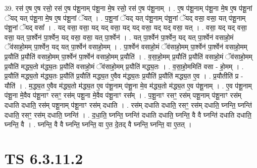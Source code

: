 \documentclass[17pt]{extarticle}
\begin{document}
39. रस॑ ए॒ष ए॒ष रसो॒ रस॑ ए॒ष प॑शू॒नाम् प॑शू॒ना मे॒ष रसो॒ रस॑ ए॒ष प॑शू॒नाम् । . ए॒ष प॑शू॒नाम् प॑शू॒ना मे॒ष ए॒ष प॑शू॒नां ॅयद् यत् प॑शू॒ना मे॒ष ए॒ष प॑शू॒नां ॅयत् । . प॒शू॒नां ॅयद् यत् प॑शू॒नाम् प॑शू॒नां ॅयद् वसा॒ वसा॒ यत् प॑शू॒नाम् प॑शू॒नां ॅयद् वसा᳚ । . यद् वसा॒ वसा॒ यद् यद् वसा॒ यद् यद् वसा॒ यद् यद् वसा॒ यत् । . वसा॒ यद् यद् वसा॒ वसा॒ यत् पा॒र्श्वेन॑ पा॒र्श्वेन॒ यद् वसा॒ वसा॒ यत् पा॒र्श्वेन॑ । . यत् पा॒र्श्वेन॑ पा॒र्श्वेन॒ यद् यत् पा॒र्श्वेन॑ वसाहो॒मं ॅव॑साहो॒मम् पा॒र्श्वेन॒ यद् यत् पा॒र्श्वेन॑ वसाहो॒मम् । . पा॒र्श्वेन॑ वसाहो॒मं ॅव॑साहो॒मम् पा॒र्श्वेन॑ पा॒र्श्वेन॑ वसाहो॒मम् प्र॒यौति॑ प्र॒यौति॑ वसाहो॒मम् पा॒र्श्वेन॑ पा॒र्श्वेन॑ वसाहो॒मम् प्र॒यौति॑ । . व॒सा॒हो॒मम् प्र॒यौति॑ प्र॒यौति॑ वसाहो॒मं ॅव॑साहो॒मम् प्र॒यौति॑ मद्ध्य॒तो म॑द्ध्य॒तः प्र॒यौति॑ वसाहो॒मं ॅव॑साहो॒मम् प्र॒यौति॑ मद्ध्य॒तः । . व॒सा॒हो॒ममिति॑ वसा - हो॒मम् । . प्र॒यौति॑ मद्ध्य॒तो म॑द्ध्य॒तः प्र॒यौति॑ प्र॒यौति॑ मद्ध्य॒त ए॒वैव म॑द्ध्य॒तः प्र॒यौति॑ प्र॒यौति॑ मद्ध्य॒त ए॒व । . प्र॒यौतीति॑ प्र - यौति॑ । . म॒द्ध्य॒त ए॒वैव म॑द्ध्य॒तो म॑द्ध्य॒त ए॒व प॑शू॒नाम् प॑शू॒ना मे॒व म॑द्ध्य॒तो म॑द्ध्य॒त ए॒व प॑शू॒नाम् । . ए॒व प॑शू॒नाम् प॑शू॒ना मे॒वैव प॑शू॒नाꣳ रसꣳ॒॒ रस॑म् पशू॒ना मे॒वैव प॑शू॒नाꣳ रस᳚म् । . प॒शू॒नाꣳ रसꣳ॒॒ रस॑म् पशू॒नाम् प॑शू॒नाꣳ रस॑म् दधाति दधाति॒ रस॑म् पशू॒नाम् प॑शू॒नाꣳ रस॑म् दधाति । . रस॑म् दधाति दधाति॒ रसꣳ॒॒ रस॑म् दधाति॒ घ्नन्ति॒ घ्नन्ति॑ दधाति॒ रसꣳ॒॒ रस॑म् दधाति॒ घ्नन्ति॑ । . द॒धा॒ति॒ घ्नन्ति॒ घ्नन्ति॑ दधाति दधाति॒ घ्नन्ति॒ वै वै घ्नन्ति॑ दधाति दधाति॒ घ्नन्ति॒ वै । . घ्नन्ति॒ वै वै घ्नन्ति॒ घ्नन्ति॒ वा ए॒त दे॒तद् वै घ्नन्ति॒ घ्नन्ति॒ वा ए॒तत् । \newline
\pagebreak
{}

\section{ TS 6.3.11.2 }
\end{document}
